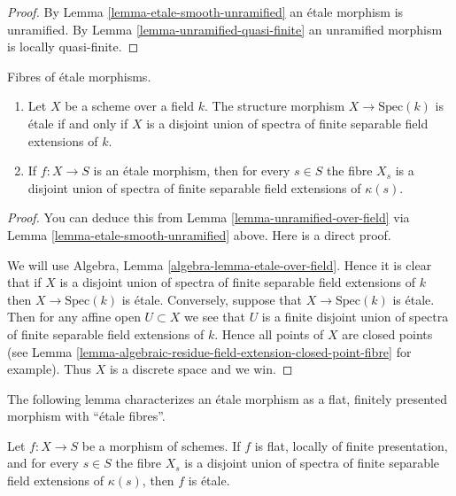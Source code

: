 \begin{proof}
By
Lemma \ref{lemma-etale-smooth-unramified}
an \'etale morphism is unramified. By
Lemma \ref{lemma-unramified-quasi-finite}
an unramified morphism is locally quasi-finite.
\end{proof}

\begin{lemma}
\label{lemma-etale-over-field}
Fibres of \'etale morphisms.
\begin{enumerate}
\item Let $X$ be a scheme over a field $k$.
The structure morphism $X \to \text{Spec}(k)$ is \'etale if
and only if $X$ is a disjoint union of spectra of finite separable
field extensions of $k$.
\item If $f : X \to S$ is an \'etale morphism, then for every $s \in S$ the
fibre $X_s$ is a disjoint union of spectra of finite separable field
extensions of $\kappa(s)$.
\end{enumerate}
\end{lemma}

\begin{proof}
You can deduce this from Lemma \ref{lemma-unramified-over-field}
via Lemma \ref{lemma-etale-smooth-unramified} above.
Here is a direct proof.

\medskip\noindent
We will use Algebra, Lemma \ref{algebra-lemma-etale-over-field}.
Hence it is clear that if $X$ is a disjoint union of spectra of finite
separable field extensions of $k$ then $X \to \text{Spec}(k)$ is \'etale.
Conversely, suppose that $X \to \text{Spec}(k)$ is \'etale. Then for any affine
open $U \subset X$ we see that $U$ is a finite disjoint union of spectra
of finite separable field extensions of $k$. Hence all points of $X$
are closed points (see
Lemma \ref{lemma-algebraic-residue-field-extension-closed-point-fibre}
for example). Thus $X$ is a discrete space and we win.
\end{proof}

\noindent
The following lemma characterizes an \'etale morphism as a
flat, finitely presented morphism with ``\'etale fibres''.

\begin{lemma}
\label{lemma-etale-flat-etale-fibres}
Let $f : X \to S$ be a morphism of schemes.
If $f$ is flat, locally of finite presentation, and for every $s \in S$
the fibre $X_s$ is a disjoint union of spectra of finite separable
field extensions of $\kappa(s)$, then $f$ is \'etale.
\end{lemma}

